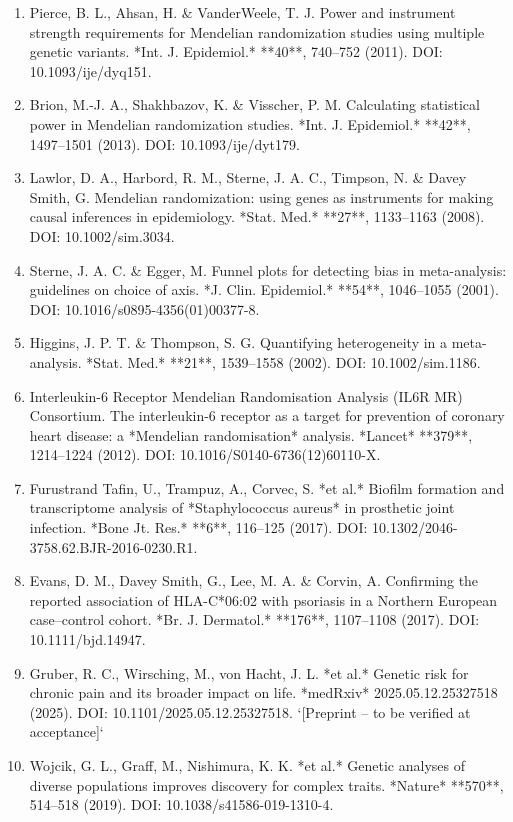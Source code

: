 \documentclass[11pt]{article}
\begin{document}
\begin{enumerate}
\item Pierce, B. L., Ahsan, H. \& VanderWeele, T. J. Power and instrument strength requirements for Mendelian randomization studies using multiple genetic variants. *Int. J. Epidemiol.* **40**, 740--752 (2011). DOI: 10.1093/ije/dyq151.
\item Brion, M.-J. A., Shakhbazov, K. \& Visscher, P. M. Calculating statistical power in Mendelian randomization studies. *Int. J. Epidemiol.* **42**, 1497--1501 (2013). DOI: 10.1093/ije/dyt179.
\item Lawlor, D. A., Harbord, R. M., Sterne, J. A. C., Timpson, N. \& Davey Smith, G. Mendelian randomization: using genes as instruments for making causal inferences in epidemiology. *Stat. Med.* **27**, 1133--1163 (2008). DOI: 10.1002/sim.3034.
\item Sterne, J. A. C. \& Egger, M. Funnel plots for detecting bias in meta-analysis: guidelines on choice of axis. *J. Clin. Epidemiol.* **54**, 1046--1055 (2001). DOI: 10.1016/s0895-4356(01)00377-8.
\item Higgins, J. P. T. \& Thompson, S. G. Quantifying heterogeneity in a meta-analysis. *Stat. Med.* **21**, 1539--1558 (2002). DOI: 10.1002/sim.1186.
\item Interleukin-6 Receptor Mendelian Randomisation Analysis (IL6R MR) Consortium. The interleukin-6 receptor as a target for prevention of coronary heart disease: a *Mendelian randomisation* analysis. *Lancet* **379**, 1214--1224 (2012). DOI: 10.1016/S0140-6736(12)60110-X.
\item Furustrand Tafin, U., Trampuz, A., Corvec, S. *et al.* Biofilm formation and transcriptome analysis of *Staphylococcus aureus* in prosthetic joint infection. *Bone Jt. Res.* **6**, 116--125 (2017). DOI: 10.1302/2046-3758.62.BJR-2016-0230.R1.
\item Evans, D. M., Davey Smith, G., Lee, M. A. \& Corvin, A. Confirming the reported association of HLA-C*06:02 with psoriasis in a Northern European case--control cohort. *Br. J. Dermatol.* **176**, 1107--1108 (2017). DOI: 10.1111/bjd.14947.
\item Gruber, R. C., Wirsching, M., von Hacht, J. L. *et al.* Genetic risk for chronic pain and its broader impact on life. *medRxiv* 2025.05.12.25327518 (2025). DOI: 10.1101/2025.05.12.25327518. `[Preprint -- to be verified at acceptance]`
\item Wojcik, G. L., Graff, M., Nishimura, K. K. *et al.* Genetic analyses of diverse populations improves discovery for complex traits. *Nature* **570**, 514--518 (2019). DOI: 10.1038/s41586-019-1310-4.

\end{enumerate}
\end{document}
